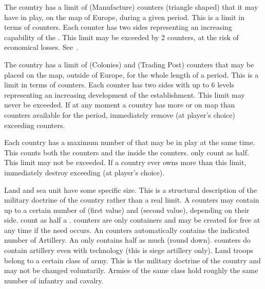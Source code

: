 \aparag[Manufactures] The country has a limit of \MNU (Manufacture) counters
(triangle shaped) that it may have in play, on the map of Europe, during a
given period.
\bparag This is a limit in terms of counters. Each counter has two sides
representing an increasing capability of the \MNU.
\bparag This limit may be exceeded by 2 counters, at the risk of economical
losses. See~.

 The country has a limit of \COL (Colonies)
and \TP (Trading Post) counters that may be placed on the map, outside of
Europe, for the whole length of a period.
\bparag This is a limit in terms of counters. Each counter has two sides with
up to 6 levels representing an increasing development of the establishment.
\bparag This limit may never be exceeded. If at any moment a country has more
\COL or \TP on map than counters available for the period, %
immediately remove (at player's choice) exceeding counters.

\aparag[Fleet] Each country has a maximum number of \ND that may be in play at
the same time.
\bparag This counts both the \ND counters and the \ND inside the \FLEET
counters.
\bparag \NGD only count as half.
\bparag This limit may not be exceeded. If a country ever owns more \ND than
this limit, %
immediately destroy exceeding \ND (at player's choice).

 Land and sea unit have some specific size. This is a
structural description of the military doctrine of the country rather than a
real limit.
\bparag A \FLEET counters may contain up to a certain number of \ND (first
value) and \NTD (second value), depending on their side. \NGD count as half a
\ND. \FLEET counters are only containers and may be created for free at any
time if the need occurs.
\bparag An \ARMY\faceplus counters automatically contains the indicated number
of Artillery. An \ARMY\facemoins only contains half as much (round
down). \ARMY counters do contain artillery even with 
technology (this is siege artillery only).
\bparag Land troops belong to a certain class of army. This is the military
doctrine of the country and may not be changed voluntarily. Armies of the same
class hold roughly the same number of infantry and cavalry.

